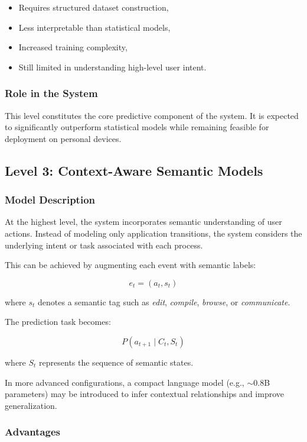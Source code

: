 \documentclass[11pt]{article}
\begin{document}
\begin{itemize}
\item Requires structured dataset construction,
\item Less interpretable than statistical models,
\item Increased training complexity,
\item Still limited in understanding high-level user intent.
\end{itemize}

\subsubsection{Role in the System}

This level constitutes the core predictive component of the system. It is expected to significantly outperform statistical models while remaining feasible for deployment on personal devices.

\subsection{Level 3: Context-Aware Semantic Models}

\subsubsection{Model Description}

At the highest level, the system incorporates semantic understanding of user actions. Instead of modeling only application transitions, the system considers the underlying intent or task associated with each process.

This can be achieved by augmenting each event with semantic labels:

\[
e_t = (a_t, s_t)
\]

where $s_t$ denotes a semantic tag such as \textit{edit}, \textit{compile}, \textit{browse}, or \textit{communicate}.

The prediction task becomes:

\[
P(a_{t+1} \mid C_t, S_t)
\]

where $S_t$ represents the sequence of semantic states.

In more advanced configurations, a compact language model (e.g., $\sim$0.8B parameters) may be introduced to infer contextual relationships and improve generalization.

\subsubsection{Advantages}
\end{document}

